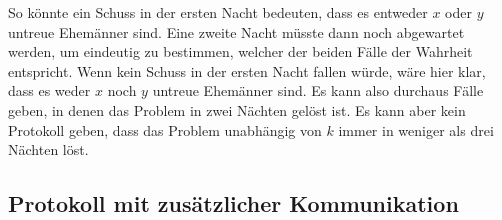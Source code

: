 So könnte ein Schuss in der ersten Nacht bedeuten, dass es entweder $x$ oder $y$ untreue Ehemänner sind. Eine zweite Nacht müsste dann noch abgewartet werden, um eindeutig zu bestimmen, welcher der beiden Fälle der Wahrheit entspricht. Wenn kein Schuss in der ersten Nacht fallen würde, wäre hier klar, dass es weder $x$ noch $y$ untreue Ehemänner sind. Es kann also durchaus Fälle geben, in denen das Problem in zwei Nächten gelöst ist. Es kann aber kein Protokoll geben, dass das Problem unabhängig von $k$ immer in weniger als drei Nächten löst.\\

\subsection{Protokoll mit zusätzlicher Kommunikation}

